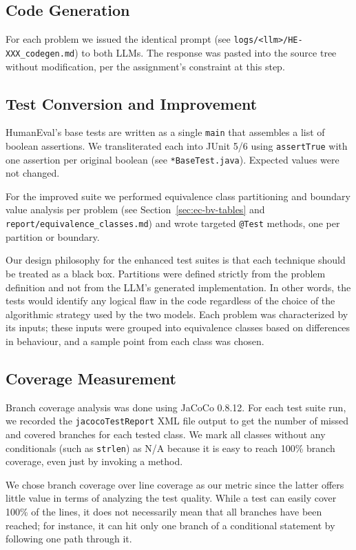 \documentclass[journal]{IEEEtran}
\begin{document}
\subsection{Code Generation}
For each problem we issued the identical prompt (see
\texttt{logs/<llm>/HE-XXX\_codegen.md}) to both LLMs. The response was pasted
into the source tree without modification, per the assignment's constraint
at this step.

\subsection{Test Conversion and Improvement}
HumanEval's base tests are written as a single \texttt{main} that assembles
a list of boolean assertions. We transliterated each into JUnit 5/6 using
\texttt{assertTrue} with one assertion per original boolean (see
\texttt{*BaseTest.java}). Expected values were not changed.

For the improved suite we performed equivalence class partitioning and
boundary value analysis per problem (see
Section~\ref{sec:ec-bv-tables} and \texttt{report/equivalence\_classes.md})
and wrote targeted \texttt{@Test} methods, one per partition or boundary.

Our design philosophy for the enhanced test suites is that each technique should be treated as a black box. Partitions were defined strictly from the problem definition and not from the LLM’s generated implementation. In other words, the tests would identify any logical flaw in the code regardless of the choice of the algorithmic strategy used by the two models. Each problem was characterized by its inputs; these inputs were grouped into equivalence classes based on differences in behaviour, and a sample point from each class was chosen.

\subsection{Coverage Measurement}
Branch coverage analysis was done using JaCoCo 0.8.12. For each test suite run, we recorded the \texttt{jacocoTestReport} XML file output to get the number of missed and covered branches for each tested class. We mark all classes without any conditionals (such as \texttt{strlen}) as N/A because it is easy to reach 100\% branch coverage, even just by invoking a method.

We chose branch coverage over line coverage as our metric since the latter offers little value in terms of analyzing the test quality. While a test can easily cover 100\% of the lines, it does not necessarily mean that all branches have been reached; for instance, it can hit only one branch of a conditional statement by following one path through it.
\end{document}
